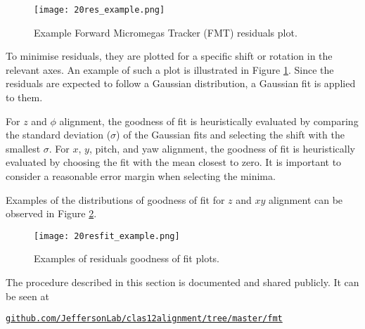     \begin{figure}[b!]
        \texttt{[image: 20res\_example.png]}
        \caption[Example FMT residuals plot]
        {Example Forward Micromegas Tracker (FMT) residuals plot.}
        \label{fig::12.20::fmt_residuals_example}
    \end{figure}

    To minimise residuals, they are plotted for a specific shift or rotation in the relevant axes.
    An example of such a plot is illustrated in Figure \ref{fig::12.20::fmt_residuals_example}.
    Since the residuals are expected to follow a Gaussian distribution, a Gaussian fit is applied to them.

    For $z$ and $\phi$ alignment, the goodness of fit is heuristically evaluated by comparing the standard deviation ($\sigma$) of the Gaussian fits and selecting the shift with the smallest $\sigma$.
    For $x$, $y$, pitch, and yaw alignment, the goodness of fit is heuristically evaluated by choosing the fit with the mean closest to zero.
    It is important to consider a reasonable error margin when selecting the minima.

    Examples of the distributions of goodness of fit for $z$ and $xy$ alignment can be observed in Figure \ref{fig::12.20::fmt_residuals_fit_example}.

    \begin{figure}[t!]
        \texttt{[image: 20resfit\_example.png]}
        \caption[Examples of residuals goodness of fit plots]
        {Examples of residuals goodness of fit plots.}
        \label{fig::12.20::fmt_residuals_fit_example}
    \end{figure}

    
    

    The procedure described in this section is documented and shared publicly.
    It can be seen at

    \href{https://github.com/JeffersonLab/clas12alignment/tree/master/fmt}{\texttt{github.com/JeffersonLab/clas12alignment/tree/master/fmt}}
